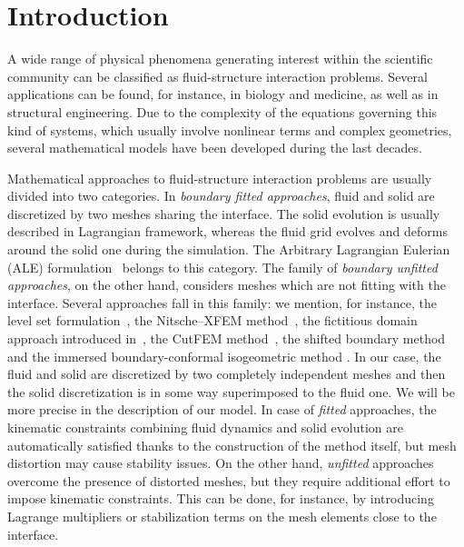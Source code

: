 \documentclass[oneside]{amsart} %
\begin{document}
	\maketitle
	
	\section{Introduction}
	
	A wide range of physical phenomena generating interest within the scientific community can be classified as fluid-structure interaction problems. Several applications can be found, for instance, in biology and medicine, as well as in structural engineering. Due to the complexity of the equations governing this kind of systems, which usually involve nonlinear terms and complex geometries, several mathematical models have been developed during the last decades.
	
	Mathematical approaches to fluid-structure interaction problems are
	usually divided into two categories. In \textit{boundary fitted approaches},
	fluid and solid are discretized by two meshes sharing the interface. The solid
	evolution is usually described in Lagrangian framework, whereas the fluid grid
	evolves and deforms around the solid one during the simulation. The Arbitrary
	Lagrangian Eulerian (ALE)
	formulation~\cite{hirt1974arbitrary,donea2004arbitrary,hughes1981lagrangian}
	belongs to this category. The family of \textit{boundary unfitted approaches},
	on the other hand, considers meshes which are not fitting with the interface.
	Several approaches fall in this family: we mention, for instance, the level set formulation~\cite{chang1996level}, the Nitsche--XFEM method~\cite{alauzet2016nitsche,burman2014unfitted}, the fictitious domain approach introduced in~\cite{glowinski2001fictitious,glowinski1997lagrange}, the CutFEM method~\cite{burman2015cutfem}, the shifted boundary method \cite{atallah2021analysis} and the immersed boundary-conformal isogeometric method \cite{wei2021immersed}. 
	In our case, the fluid and solid are discretized by two completely independent
	meshes and then the solid discretization is in some way superimposed to the
	fluid one. We will be more precise in the description of our model.
	In case of \textit{fitted} approaches, the kinematic constraints combining fluid dynamics and solid evolution are automatically satisfied thanks to the construction of the method itself, but mesh distortion may cause stability issues. On the other hand, \textit{unfitted} approaches overcome the presence of distorted meshes, but they require additional effort to impose kinematic constraints. This can be done, for instance, by introducing Lagrange multipliers or stabilization terms on the mesh elements close to the interface.
	
\end{document}
